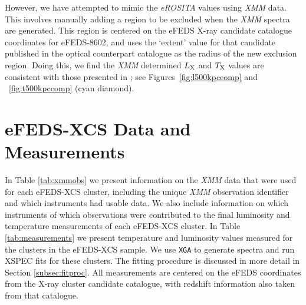 \documentclass[fleqn,usenatbib]{mnras}
\begin{document}
However, we have attempted to mimic the {\em eROSITA} values using {\em XMM} data. This involves manually adding a region to be excluded when the {\em XMM} spectra are generated. This region is centered on the eFEDS X-ray candidate catalogue coordinates for eFEDS-8602, and uses the `extent' value for that candidate published in the optical counterpart catalogue as the radius of the new exclusion region. Doing this, we find the {\em XMM} determined $L_{\rm{X}}$ and $T_{\rm{X}}$ values are consistent with those presented in \cite{efedsclustercat}; see Figures~\ref{fig:l500kpccomp} and ~\ref{fig:t500kpccomp} (cyan diamond). 



\section{\lowercase{e}FEDS-XCS Data and Measurements}
\label{app:measurements}
In Table \ref{tab:xmmobs} we present information on the {\em XMM} data that were used for each eFEDS-XCS cluster, including the unique {\em XMM} observation identifier and which instruments had usable data. We also include information on which instruments of which observations were contributed to the final luminosity and temperature measurements of each eFEDS-XCS cluster. 
In Table \ref{tab:measurements} we present temperature and luminosity values measured for the clusters in the eFEDS-XCS sample. We use \texttt{XGA} to generate spectra and run XSPEC fits for these clusters. The fitting procedure is discussed in more detail in Section \ref{subsec:fitproc}. All measurements are centered on the eFEDS coordinates from the X-ray cluster candidate catalogue, with redshift information also taken from that catalogue.
\end{document}
